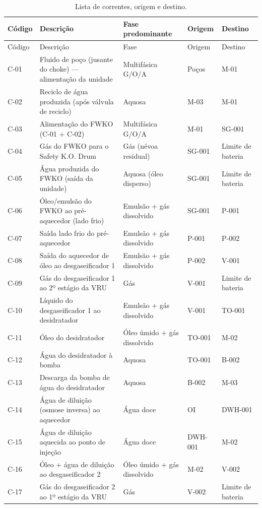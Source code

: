\documentclass[11pt,a4paper]{article}
\numberwithin{equation}{section}
\numberwithin{table}{section}
\numberwithin{figure}{section}
\begin{document}
\begin{longtable}{lL{5.6cm}L{2.8cm}L{1.9cm}L{2.5cm}}
\caption{Lista de correntes, origem e destino.}\label{tab:correntes}\\\toprule
Código & Descrição & Fase predominante & Origem & Destino\\\midrule\endfirsthead
\toprule Código & Descrição & Fase & Origem & Destino\\\midrule\endhead

C-01 & Fluido de poço (jusante do choke) — alimentação da unidade & Multifásica G/O/A & Poços & M-01\\
C-02 & Reciclo de água produzida (após válvula de reciclo) & Aquosa & M-03 & M-01\\
C-03 & Alimentação do FWKO (C-01 + C-02) & Multifásica G/O/A & M-01 & SG-001\\
C-04 & Gás do FWKO para o Safety K.O. Drum & Gás (névoa residual) & SG-001 & Limite de bateria\\
C-05 & Água produzida do FWKO (saída da unidade) & Aquosa (óleo disperso) & SG-001 & Limite de bateria\\
C-06 & Óleo/emulsão do FWKO ao pré-aquecedor (lado frio) & Emulsão + gás dissolvido & SG-001 & P-001\\
C-07 & Saída lado frio do pré-aquecedor & Emulsão + gás dissolvido & P-001 & P-002\\
C-08 & Saída do aquecedor de óleo ao desgaseificador 1 & Emulsão + gás dissolvido & P-002 & V-001\\
C-09 & Gás do desgaseificador 1 ao 2º estágio da VRU & Gás & V-001 & Limite de bateria\\
C-10 & Líquido do desgaseificador 1 ao desidratador & Emulsão + gás dissolvido & V-001 & TO-001\\
C-11 & Óleo do desidratador & Óleo úmido + gás dissolvido & TO-001 & M-02\\
C-12 & Água do desidratador à bomba & Aquosa & TO-001 & B-002\\
C-13 & Descarga da bomba de água do desidratador & Aquosa & B-002 & M-03\\
C-14 & Água de diluição (osmose inversa) ao aquecedor & Água doce & OI & DWH-001\\
C-15 & Água de diluição aquecida ao ponto de injeção & Água doce & DWH-001 & M-02\\
C-16 & Óleo + água de diluição ao desgaseificador 2 & Óleo úmido + gás dissolvido & M-02 & V-002\\
C-17 & Gás do desgaseificador 2 ao 1º estágio da VRU & Gás & V-002 & Limite de bateria\\

\end{longtable}
\end{document}
